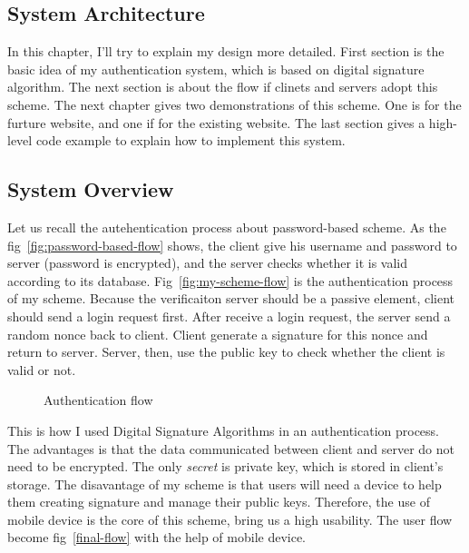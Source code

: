 \begin{CJK}{Bg5}{bsmi}


\chapter{System Architecture}

In this chapter, I'll try to explain my design more detailed. First section is the basic idea of my authentication system, which is based on digital signature algorithm. The next section is about the flow if clinets and servers adopt this scheme. The next chapter gives two demonstrations of this scheme. One is for the furture website, and one if for the existing website. The last section gives a high-level code example to explain how to implement this system.

\section{System Overview}

Let us recall the autehentication process about password-based scheme. As the fig~\ref{fig:password-based-flow} shows, the client give his username and password to server (password is encrypted), and the server checks whether it is valid according to its database. Fig~\ref{fig:my-scheme-flow} is the authentication process of my scheme. Because the verificaiton server should be a passive element, client should send a login request first. After receive a login request, the server send a random nonce back to client. Client generate a signature for this nonce and return to server. Server, then, use the public key to check whether the client is valid or not.

\begin{figure}
\centering
{}
\caption{Authentication flow}
\end{figure}

This is how I used Digital Signature Algorithms in an authentication process. The advantages is that the data communicated between client and server do not need to be encrypted. The only \emph{secret} is private key, which is stored in client's storage. The disavantage of my scheme is that users will need a device to help them creating signature and manage their public keys. Therefore, the use of mobile device is the core of this scheme, bring us a high usability. The user flow become fig~\ref{final-flow} with the help of mobile device.


\end{CJK}
